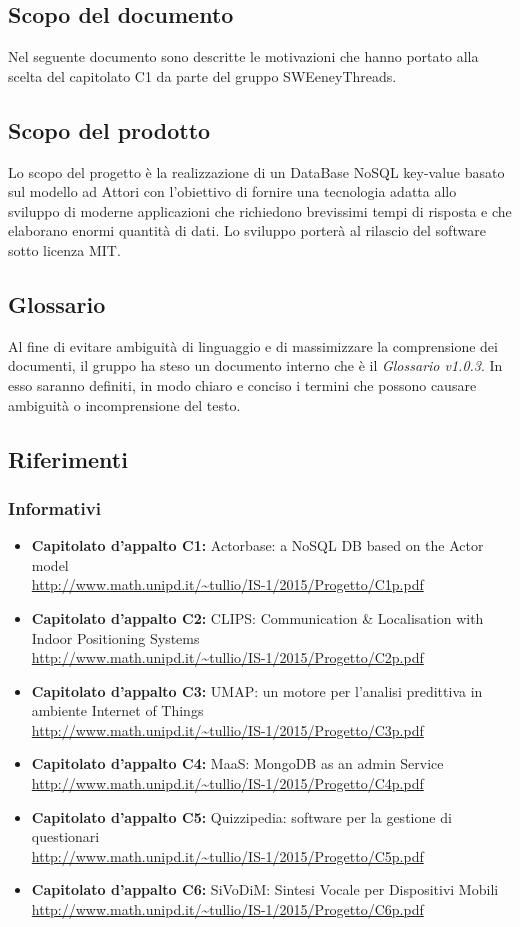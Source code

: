 \documentclass[a4paper]{article}
\begin{document}
	\subsection{Scopo del documento}
		Nel seguente documento sono descritte le motivazioni che hanno portato alla scelta del 
		capitolato C1 da parte del gruppo SWEeneyThreads. 
	\subsection{Scopo del prodotto}
		Lo scopo del progetto è la realizzazione di un DataBase NoSQL key-value basato sul modello ad 
		Attori con l'obiettivo di fornire una tecnologia adatta allo sviluppo di moderne 
		applicazioni che richiedono brevissimi tempi di risposta e che elaborano enormi quantità 
		di dati. Lo sviluppo porterà al rilascio del software sotto licenza MIT.
	\subsection{Glossario}
		Al fine di evitare ambiguità di linguaggio e di massimizzare la comprensione dei documenti, il 
      gruppo ha steso un documento interno che è il \emph{Glossario v1.0.3}. In esso saranno definiti, in modo
      chiaro e conciso i termini che possono causare ambiguità o incomprensione del testo.
	\subsection{Riferimenti}
	\subsubsection{Informativi}	
		\begin{itemize}
			\item \textbf{Capitolato d'appalto C1:} Actorbase: a NoSQL DB based on the Actor model \\
			\url{http://www.math.unipd.it/~tullio/IS-1/2015/Progetto/C1p.pdf}
			\item \textbf{Capitolato d'appalto C2:} CLIPS: Communication \& Localisation with Indoor
			 Positioning Systems \\
			\url{http://www.math.unipd.it/~tullio/IS-1/2015/Progetto/C2p.pdf}
			\item \textbf{Capitolato d'appalto C3:} UMAP: un motore per l'analisi predittiva in ambiente
			 Internet of Things \\
			\url{http://www.math.unipd.it/~tullio/IS-1/2015/Progetto/C3p.pdf}
			\item \textbf{Capitolato d'appalto C4:} MaaS: MongoDB as an admin Service \\
			\url{http://www.math.unipd.it/~tullio/IS-1/2015/Progetto/C4p.pdf}
			\item \textbf{Capitolato d'appalto C5:} Quizzipedia: software per la gestione di questionari \\
			\url{http://www.math.unipd.it/~tullio/IS-1/2015/Progetto/C5p.pdf}
			\item \textbf{Capitolato d'appalto C6:} SiVoDiM: Sintesi Vocale per Dispositivi Mobili \\
			\url{http://www.math.unipd.it/~tullio/IS-1/2015/Progetto/C6p.pdf}
		\end{itemize}
\end{document}
